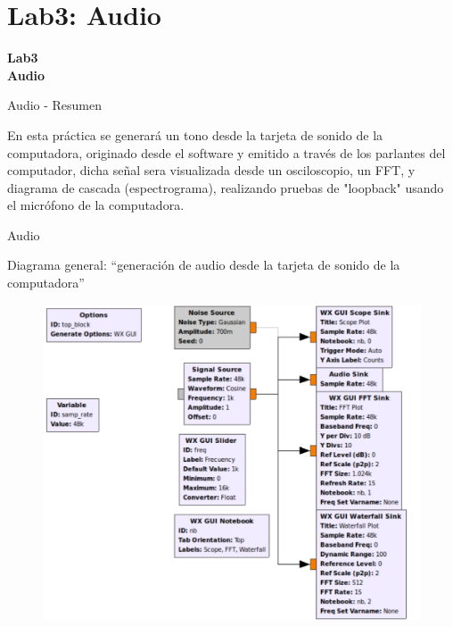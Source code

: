 \section{Lab3: Audio}
\begin{frame}{}


\bfseries{\textrm{\LARGE Lab3\\ \Large Audio}}
\raggedright
\end{frame}

\begin{frame}{Audio - Resumen}



En esta práctica se generará un tono desde la tarjeta de sonido de la computadora, originado desde el software y emitido a través de los parlantes del computador, dicha señal sera visualizada desde un osciloscopio, un FFT, y diagrama de cascada (espectrograma), realizando pruebas de "loopback" usando el micrófono de la computadora.

\end{frame}

\begin{frame}{Audio}

Diagrama general: “generación de audio desde la tarjeta de sonido de la computadora”

\begin{figure}

\begin{center}
\vspace{-0.3cm}
\includegraphics[width=.7\textwidth]{lab3/pdf/lab3_1.pdf}
\end{center}
\end{figure}

\end{frame}

